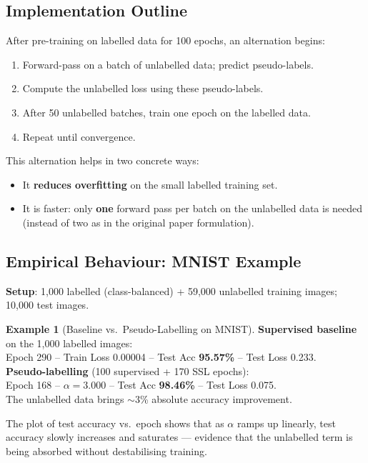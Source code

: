 \documentclass[11pt,a4paper]{article}
\theoremstyle{definition}
\newtheorem{example}{Example}[section]
\theoremstyle{plain}
\theoremstyle{remark}
\begin{document}
\subsection{Implementation Outline}

After pre-training on labelled data for 100 epochs, an alternation begins:

\begin{enumerate}
    \item Forward-pass on a batch of unlabelled data; predict pseudo-labels.
    \item Compute the unlabelled loss using these pseudo-labels.
    \item After 50 unlabelled batches, train one epoch on the labelled data.
    \item Repeat until convergence.
\end{enumerate}

This alternation helps in two concrete ways:
\begin{itemize}
    \item It \textbf{reduces overfitting} on the small labelled training set.
    \item It is faster: only \textbf{one} forward pass per batch on the unlabelled data is needed (instead of two as in the original paper formulation).
\end{itemize}

\subsection{Empirical Behaviour: MNIST Example}

\textbf{Setup}: 1{,}000 labelled (class-balanced) + 59{,}000 unlabelled training images; 10{,}000 test images.

\begin{example}[Baseline vs.\ Pseudo-Labelling on MNIST]
\textbf{Supervised baseline} on the 1{,}000 labelled images:\\
Epoch 290 -- Train Loss 0.00004 -- Test Acc \textbf{95.57\%} -- Test Loss 0.233.\\
\textbf{Pseudo-labelling} (100 supervised + 170 SSL epochs):\\
Epoch 168 -- $\alpha = 3.000$ -- Test Acc \textbf{98.46\%} -- Test Loss 0.075.\\
The unlabelled data brings $\sim 3$\% absolute accuracy improvement.
\end{example}

The plot of test accuracy vs.\ epoch shows that as $\alpha$ ramps up linearly, test accuracy slowly increases and saturates --- evidence that the unlabelled term is being absorbed without destabilising training.
\end{document}
